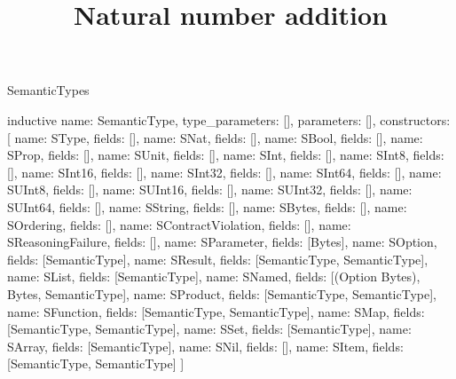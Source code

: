\begin{lexlean}{SemanticTypes}
\title{Natural number addition}
\begin{semanticmodule}
inductive{
  name: SemanticType,
  type_parameters: [],
  parameters: [],
  constructors: [
    {name: SType, fields: []},
    {name: SNat, fields: []},
    {name: SBool, fields: []},
    {name: SProp, fields: []},
    {name: SUnit, fields: []},
    {name: SInt, fields: []},
    {name: SInt8, fields: []},
    {name: SInt16, fields: []},
    {name: SInt32, fields: []},
    {name: SInt64, fields: []},
    {name: SUInt8, fields: []},
    {name: SUInt16, fields: []},
    {name: SUInt32, fields: []},
    {name: SUInt64, fields: []},
    {name: SString, fields: []},
    {name: SBytes, fields: []},
    {name: SOrdering, fields: []},
    {name: SContractViolation, fields: []},
    {name: SReasoningFailure, fields: []},
    {name: SParameter, fields: [Bytes]},
    {name: SOption, fields: [SemanticType]},
    {name: SResult, fields: [SemanticType, SemanticType]},
    {name: SList, fields: [SemanticType]},
    {name: SNamed, fields: [(Option Bytes), Bytes, SemanticType]},
    {name: SProduct, fields: [SemanticType, SemanticType]},
    {name: SFunction, fields: [SemanticType, SemanticType]},
    {name: SMap, fields: [SemanticType, SemanticType]},
    {name: SSet, fields: [SemanticType]},
    {name: SArray, fields: [SemanticType]},
    {name: SNil, fields: []},
    {name: SItem, fields: [SemanticType, SemanticType]}
  ]
}


\end{semanticmodule}
\end{lexlean}
